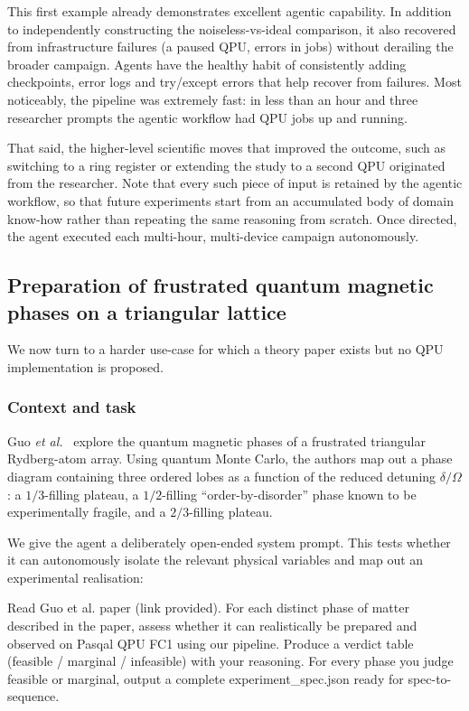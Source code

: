 \documentclass[aps,pra,reprint,amssymb,superscriptaddress,nofootinbib,floatfix]{revtex4-2}
\begin{document}
This first example already demonstrates excellent agentic capability. In addition to independently constructing the noiseless-vs-ideal comparison, it also recovered from infrastructure failures (a paused QPU, errors in jobs) without derailing the broader campaign. Agents have the healthy habit of consistently adding checkpoints, error logs and try/except errors that help recover from failures. Most noticeably, the pipeline was extremely fast: in less than an hour and three researcher prompts the agentic workflow had QPU jobs up and running.

That said, the higher-level scientific moves that improved the outcome, such as switching to a ring register or extending the study to a second QPU originated from the researcher. Note that every such piece of input is retained by the agentic workflow, so that future experiments start from an accumulated body of domain know-how rather than repeating the same reasoning from scratch. Once directed, the agent executed each multi-hour, multi-device campaign autonomously.


\subsection{Preparation of frustrated quantum magnetic phases on a triangular lattice}\label{sec:ex_guo}

We now turn to a harder use-case for which a theory paper exists but no QPU implementation is proposed.

\subsubsection{Context and task}

Guo \emph{et al.}~\cite{guo2023triangular} explore the quantum magnetic phases of a
frustrated triangular Rydberg-atom array. Using quantum Monte Carlo, the authors map
out a phase diagram containing three ordered lobes as a function of the reduced
detuning $\delta/\Omega$: a $1/3$-filling plateau, a
$1/2$-filling ``order-by-disorder'' phase known to be experimentally fragile, and a
$2/3$-filling plateau.

We give the agent a deliberately open-ended system prompt. This tests whether it can autonomously isolate the relevant physical variables and map out an experimental realisation:

\begin{promptbox}[title={Agent Prompt: Phase Evaluation}]
Read Guo et al. paper (link provided). For each distinct phase of matter
described in the paper, assess whether it can realistically be prepared and observed
on Pasqal QPU FC1 using our pipeline. Produce a verdict table (feasible /
marginal / infeasible) with your reasoning. For every phase you judge feasible or
marginal, output a complete experiment\_spec.json ready for spec-to-sequence.
\end{promptbox}
\end{document}
